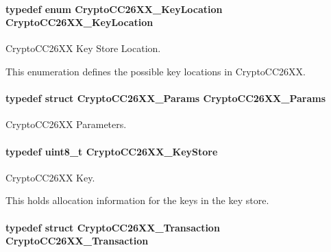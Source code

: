 \paragraph[{Crypto\+C\+C26\+X\+X\+\_\+\+Key\+Location}]{\setlength{\rightskip}{0pt plus 5cm}typedef enum {\bf Crypto\+C\+C26\+X\+X\+\_\+\+Key\+Location}  {\bf Crypto\+C\+C26\+X\+X\+\_\+\+Key\+Location}}\label{_crypto_c_c26_x_x_8h_a4e214e5283d16ac67e593c7c8a5bc058}


Crypto\+C\+C26\+X\+X Key Store Location. 

This enumeration defines the possible key locations in Crypto\+C\+C26\+X\+X. 
\paragraph[{Crypto\+C\+C26\+X\+X\+\_\+\+Params}]{\setlength{\rightskip}{0pt plus 5cm}typedef struct {\bf Crypto\+C\+C26\+X\+X\+\_\+\+Params}  {\bf Crypto\+C\+C26\+X\+X\+\_\+\+Params}}\label{_crypto_c_c26_x_x_8h_afd8b8a794d92fe38d4806238c3b6fef7}


Crypto\+C\+C26\+X\+X Parameters. 

\paragraph[{Crypto\+C\+C26\+X\+X\+\_\+\+Key\+Store}]{\setlength{\rightskip}{0pt plus 5cm}typedef uint8\+\_\+t {\bf Crypto\+C\+C26\+X\+X\+\_\+\+Key\+Store}}\label{_crypto_c_c26_x_x_8h_a30e647b6ad6b608b60990929200686e0}


Crypto\+C\+C26\+X\+X Key. 

This holds allocation information for the keys in the key store. 
\paragraph[{Crypto\+C\+C26\+X\+X\+\_\+\+Transaction}]{\setlength{\rightskip}{0pt plus 5cm}typedef struct {\bf Crypto\+C\+C26\+X\+X\+\_\+\+Transaction}  {\bf Crypto\+C\+C26\+X\+X\+\_\+\+Transaction}}\label{_crypto_c_c26_x_x_8h_a7d5a6e41436163786d2e01c0122a3de7}


